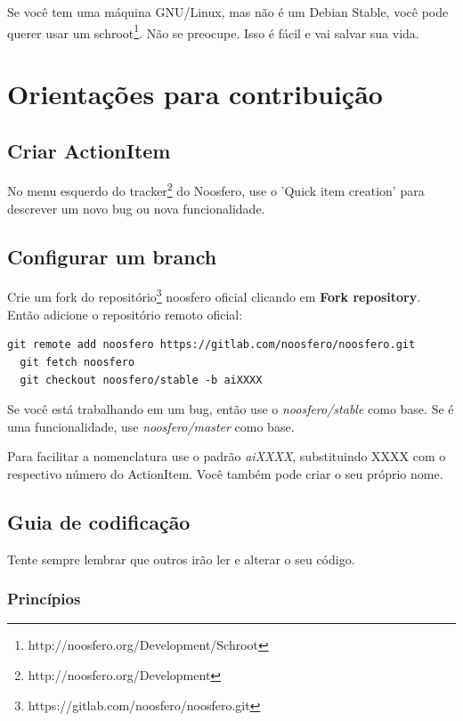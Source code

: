 \documentclass[11pt]{article}
\begin{document}
Se você tem uma máquina GNU/Linux, mas não é um Debian Stable, você pode querer
usar um schroot\footnote{http://noosfero.org/Development/Schroot}. Não se
preocupe. Isso é fácil e vai salvar sua vida.

\section{Orientações para contribuição}


\subsection{Criar ActionItem}

No menu esquerdo do tracker\footnote{http://noosfero.org/Development} do
Noosfero, use o 'Quick item creation' para descrever um novo bug ou
nova funcionalidade.

\subsection{Configurar um branch}

Crie um fork do repositório\footnote{https://gitlab.com/noosfero/noosfero.git}
noosfero oficial clicando em {\bf Fork repository}. Então adicione o repositório
remoto oficial:

\begin{Verbatim}[frame=single,fontfamily=courier]
  git remote add noosfero https://gitlab.com/noosfero/noosfero.git
  git fetch noosfero
  git checkout noosfero/stable -b aiXXXX
\end{Verbatim}

Se você está trabalhando em um bug, então use o {\it noosfero/stable} como base. Se
é uma funcionalidade, use {\it noosfero/master} como base.

Para facilitar a nomenclatura use o padrão {\it aiXXXX}, substituindo XXXX com o
respectivo número do ActionItem. Você também pode criar o seu próprio nome.

\subsection{Guia de codificação}

Tente sempre lembrar que outros irão ler e alterar o seu código.

\subsubsection{Princípios}
\end{document}
